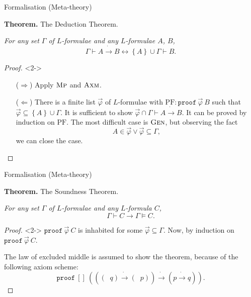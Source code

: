 \documentclass[serif,table,10pt]{beamer}
\newcommand{\0}{\texttt{0}}
\newcommand{\1}{\texttt{1}}
\newcommand{\proves}[2]{\mathtt{proof}\ #1\ #2 }
\newcommand{\listunit}[1]{[#1]}
\newcommand{\Lneg}{\mathop{\dot{\neg}}}
\newcommand{\Lto}{\mathrel{\dot{\to}}}
\begin{document}
\begin{frame}{Formalisation (Meta-theory)}

    \textbf{Theorem.} The Deduction Theorem.

    \emph{For any set $\Gamma$ of $L$-formulae and any $L$-formulae $A$, $B$, \[ \Gamma \vdash A \Lto B \leftrightarrow \left\{ A \right\} \cup \Gamma \vdash B . \]}

    \begin{proof}<2->
        \begin{itemize}
            \item[($\Rightarrow$)] Apply $\textsc{Mp}$ and $\textsc{Axm}$.
            \item[($\Leftarrow$)] There is a finite list $\vec\varphi$ of $L$-formulae with $\mathrm{PF} : \proves{\vec\varphi}{B}$ such that $\vec\varphi \subseteq \left\{ A \right\} \cup \Gamma$. It is sufficient to show $ \vec\varphi \cap \Gamma \vdash A \Lto B $. It can be proved by induction on $\mathrm{PF}$. The most difficult case is $\textsc{Gen}$, but observing the fact \[ A \in \vec\varphi \lor \vec\varphi \subseteq \Gamma , \] we can close the case.
        \end{itemize}
    \end{proof}

\end{frame}

\begin{frame}{Formalisation (Meta-theory)}

    \textbf{Theorem.} The Soundness Theorem.

    \emph{For any set $\Gamma$ of $L$-formulae and any $L$-formula $C$, \[ \Gamma \vdash C \to \Gamma \vDash C . \]}

    \begin{proof}<2->
        $\proves{\vec\varphi}{C}$ is inhabited for some $\vec\varphi \subseteq \Gamma$. Now, by induction on $\proves{\vec\varphi}{C}$.

        The law of excluded middle is assumed to show the theorem, because of the following axiom scheme: $$\proves{ \listunit{} }{ (((\Lneg q) \Lto (\Lneg p)) \Lto (p \Lto q)) } .$$
    \end{proof}

\end{frame}
\end{document}
